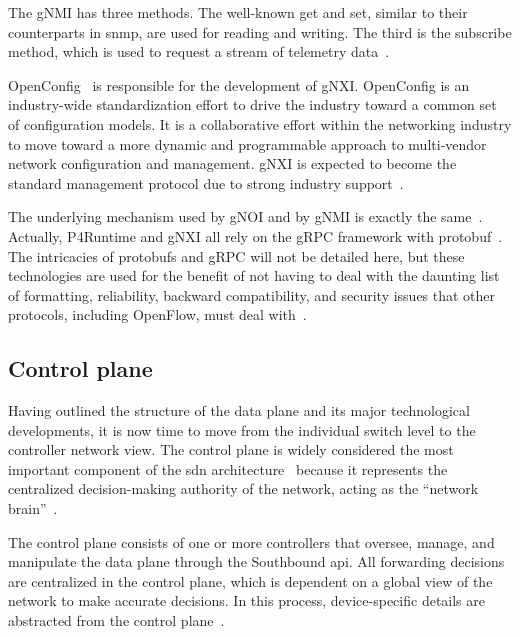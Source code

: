 The gNMI has three methods. The well-known get and set, similar to their counterparts in \gls{snmp}, are used for reading and writing. The third is the subscribe method, which is used to request a stream of telemetry data~\cite{peterson_software-defined_2021}.

OpenConfig~\cite{noauthor_openconfig_nodate} is responsible for the development of gNXI. OpenConfig is an industry-wide standardization effort to drive the industry toward a common set of configuration models. It is a collaborative effort within the networking industry to move toward a more dynamic and programmable approach to multi-vendor network configuration and management. gNXI is expected to become the standard management protocol due to strong industry support~\cite{peterson_software-defined_2021}.

The underlying mechanism used by gNOI and by gNMI is exactly the same~\cite{peterson_software-defined_2021}. Actually, P4Runtime and gNXI all rely on the gRPC framework with protobuf~\cite{hauser_survey_2021}. The intricacies of protobufs and gRPC will not be detailed here, but these technologies are used for the benefit of not having to deal with the daunting list of formatting, reliability, backward compatibility, and security issues that other protocols, including OpenFlow, must deal with~\cite{peterson_software-defined_2021}.

   
\subsection{Control plane} %
\label{subsec:control_plane}

Having outlined the structure of the data plane and its major technological developments, it is now time to move from the individual switch level to the controller network view. The control plane is widely considered the most important component of the \gls{sdn} architecture~\cite{xia_survey_2015} because it represents the centralized decision-making authority of the network, acting as the “network brain”~\cite{kreutz_software-defined_2015}.

The control plane consists of one or more controllers that oversee, manage, and manipulate the data plane through the Southbound \gls{api}. All forwarding decisions are centralized in the control plane, which is dependent on a global view of the network to make accurate decisions. In this process, device-specific details are abstracted from the control plane~\cite{latif_comprehensive_2020}. 

